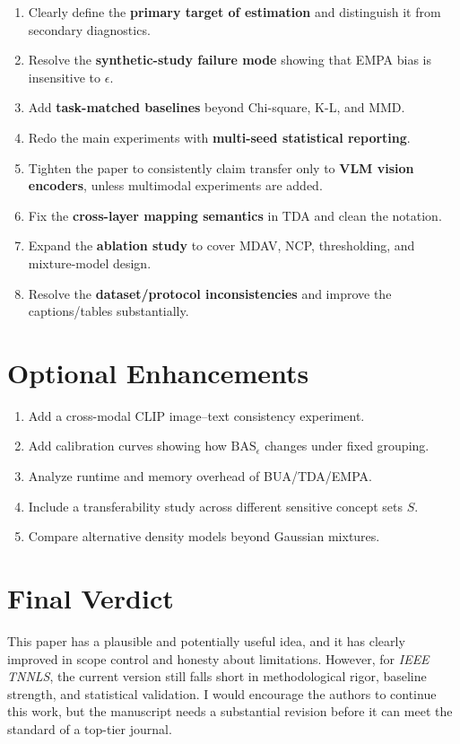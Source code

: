 \begin{enumerate}
\item Clearly define the \textbf{primary target of estimation} and distinguish it from secondary diagnostics.
\item Resolve the \textbf{synthetic-study failure mode} showing that EMPA bias is insensitive to $\epsilon$.
\item Add \textbf{task-matched baselines} beyond Chi-square, K-L, and MMD.
\item Redo the main experiments with \textbf{multi-seed statistical reporting}.
\item Tighten the paper to consistently claim transfer only to \textbf{VLM vision encoders}, unless multimodal experiments are added.
\item Fix the \textbf{cross-layer mapping semantics} in TDA and clean the notation.
\item Expand the \textbf{ablation study} to cover MDAV, NCP, thresholding, and mixture-model design.
\item Resolve the \textbf{dataset/protocol inconsistencies} and improve the captions/tables substantially.
\end{enumerate}

\section*{Optional Enhancements}

\begin{enumerate}
\item Add a cross-modal CLIP image--text consistency experiment.
\item Add calibration curves showing how $\mathrm{BAS}_\epsilon$ changes under fixed grouping.
\item Analyze runtime and memory overhead of BUA/TDA/EMPA.
\item Include a transferability study across different sensitive concept sets $S$.
\item Compare alternative density models beyond Gaussian mixtures.
\end{enumerate}

\section*{Final Verdict}

This paper has a plausible and potentially useful idea, and it has clearly improved in scope control and honesty about limitations. However, for \emph{IEEE TNNLS}, the current version still falls short in methodological rigor, baseline strength, and statistical validation. I would encourage the authors to continue this work, but the manuscript needs a substantial revision before it can meet the standard of a top-tier journal.